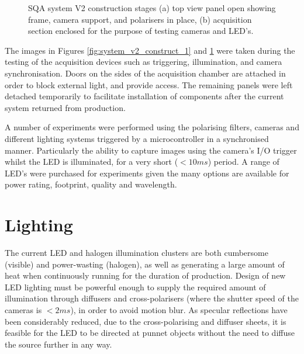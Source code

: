 \documentclass[fleqn,twoside,12pt]{report}
\begin{document}
\begin{figure}[h]
\begin{subfigure}{.5\textwidth}
		\caption{}
		\label{fig:system_v2_construct_2}
	\end{subfigure}%
	\caption{SQA system V2 construction stages (a) top view panel open showing frame, camera support, and polarisers in place, (b) acquisition section enclosed for the purpose of testing cameras and LED's.}
	\label{}
\end{figure}

The images in Figures \ref{fig:system_v2_construct_1} and \ref{fig:system_v2_construct_2} were taken during the testing of the acquisition devices such as triggering, illumination, and camera synchronisation. Doors on the sides of the acquisition chamber are attached in order to block external light, and provide access. The remaining panels were left detached temporarily to facilitate installation of components after the current system returned from production. 

A number of experiments were performed using the polarising filters, cameras and different lighting systems triggered by a microcontroller in a synchronised manner. Particularly the ability to capture images using the camera's I/O trigger whilst the LED is illuminated, for a very short ($<10ms$) period. A range of LED's were purchased for experiments given the many options are available for power rating, footprint, quality and wavelength.



\section{Lighting}

The current LED and halogen illumination clusters are both cumbersome (visible) and power-wasting (halogen), as well as generating a large amount of heat when continuously running for the duration of production. Design of new LED lighting must be powerful enough to supply the required amount of illumination through diffusers and cross-polarisers (where the shutter speed of the cameras is $<2ms$), in order to avoid motion blur. As specular reflections have been considerably reduced, due to the cross-polarising and diffuser sheets, it is feasible for the LED to be directed at punnet objects without the need to diffuse the source further in any way.
\end{document}
